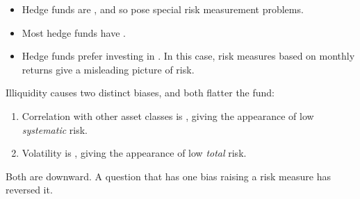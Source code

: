 \begin{itemize}
\item Hedge funds are , and so pose special risk measurement
problems.
\item Most hedge funds have .
\item Hedge funds prefer investing in . In this case, risk
measures based on monthly returns give a misleading picture of risk.
\end{itemize}

\begin{imtrapbox}[breakable=false,title={Illiquidity biases both numbers the same way}]
Illiquidity causes two distinct biases, and both flatter the fund:
\begin{enumerate}
\item Correlation with other asset classes is , giving
the appearance of low \emph{systematic} risk.
\item Volatility is , giving the appearance of low
\emph{total} risk.
\end{enumerate}
Both are downward. A question that has one bias raising a risk measure has
reversed it.
\end{imtrapbox}


